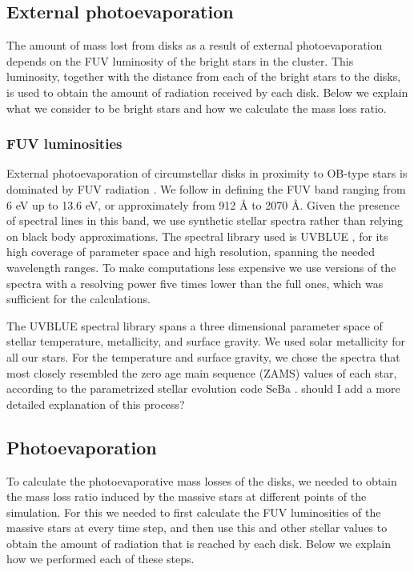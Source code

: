 \documentclass[fleqn,usenatbib]{mnras}
\newcommand\note[1]{{\colorbox{yellow!60}{\color{magenta}#1}}}
\begin{document}
\subsection{External photoevaporation}\label{photoevaporation}
The amount of mass lost from disks as a result of external photoevaporation depends on the FUV luminosity of the bright stars in the cluster. This luminosity, together with the distance from each of the bright stars to the disks, is used to obtain the amount of radiation received by each disk. Below we explain what we consider to be bright stars and how we calculate the mass loss ratio.


\subsubsection{FUV luminosities}\label{FUVluminosities}
External photoevaporation of circumstellar disks in proximity to OB-type stars is dominated by FUV radiation \citep{guarcello2016,storzer1999,gorti2016a}. We follow \citet{adams2004} in defining the FUV band ranging from 6 eV up to 13.6 eV, or approximately from 912 Å to 2070 Å. Given the presence of spectral lines in this band, we use synthetic stellar spectra rather than relying on black body approximations. The spectral library used is UVBLUE \citep{rodriguez-merino2005}, for its high coverage of parameter space and high resolution, spanning the needed wavelength ranges. To make computations less expensive we use versions of the spectra with a resolving power five times lower than the full ones, which was sufficient for the calculations. 

The UVBLUE spectral library spans a three dimensional parameter space of stellar temperature, metallicity, and surface gravity. We used solar metallicity for all our stars. For the temperature and surface gravity, we chose the spectra that most closely resembled the zero age main sequence (ZAMS) values of each star, according to the parametrized stellar evolution code SeBa \citep{portegieszwart1996, toonen2012}. \note{should I add a more detailed explanation of this process?}

\subsection{Photoevaporation}
To calculate the photoevaporative mass losses of the disks, we needed to obtain the mass loss ratio induced by the massive stars at different points of the simulation. For this we needed to first calculate the FUV luminosities of the massive stars at every time step, and then use this and other stellar values to obtain the amount of radiation that is reached by each disk. Below we explain how we performed each of these steps. 
\end{document}
